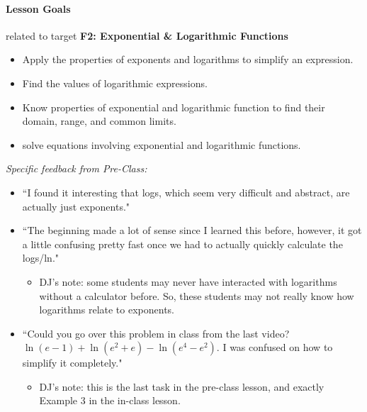 \documentclass[10pt]{article}
\begin{document}
\thispagestyle{empty}


\vspace{0.1in}

\Name{} \quad {}

\hrulefill

\paragraph*{Lesson Goals} related to target {\bf\color{ProcessBlue} F2: Exponential \& Logarithmic Functions}
\begin{itemize}
    \item Apply the properties of exponents and logarithms to simplify an expression. 
    \item Find the values of logarithmic expressions.
    \item Know properties of exponential and logarithmic function to find their domain, range, and common limits.
    \item solve equations involving exponential and logarithmic functions.
\end{itemize}


{\it Specific feedback from Pre-Class:}
\begin{itemize}
\item ``I found it interesting that logs, which seem very difficult and abstract, are actually just exponents."
\item ``The beginning made a lot of sense since I learned this before, however, it got a little confusing pretty fast once we had to actually quickly calculate the logs/ln."
    \begin{itemize}
    \item DJ's note: some students may never have interacted with logarithms without a calculator before. So, these students may not really know how logarithms relate to exponents.
    \end{itemize}
\item ``Could you go over this problem in class from the last video? $\ln(e-1) + \ln(e^2+e) - \ln(e^4-e^2)$. I was confused on how to simplify it completely."
    \begin{itemize}
    \item DJ's note: this is the last task in the pre-class lesson, and exactly Example 3 in the in-class lesson.
    \end{itemize}
\end{itemize}
\end{document}
